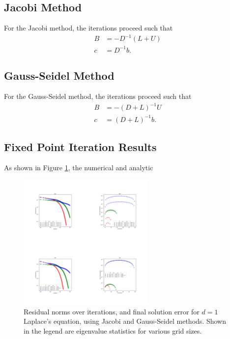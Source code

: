 \documentclass[12pt,letterpaper]{article}
\begin{document}
\subsection{Jacobi Method}
For the Jacobi method, the iterations proceed such that
\begin{align}
  B &= -D^{-1}(L+U) \\
  c &= D^{-1}b.
\end{align}



\subsection{Gauss-Seidel Method}
For the Gauss-Seidel method, the iterations proceed such that
\begin{align}
  B &= -(D+L)^{-1}U \\
  c &= (D+L)^{-1}b.
\end{align}


\subsection{Fixed Point Iteration Results}
As shown in Figure \ref{fig:FixedPt}, the numerical and analytic 


\begin{figure}[ht]
  \centering
  \includegraphics[width=0.6\textwidth,trim={0 0 0 6cm},clip]{Ex1.pdf}
  \caption{Residual norms over iterations, and final solution error for $d=1$ Laplace's equation, using Jacobi and Gauss-Seidel methods. Shown in the legend are eigenvalue statistics for various grid sizes.}
  \label{fig:FixedPt}
\end{figure}

% 
% 
\end{document}
